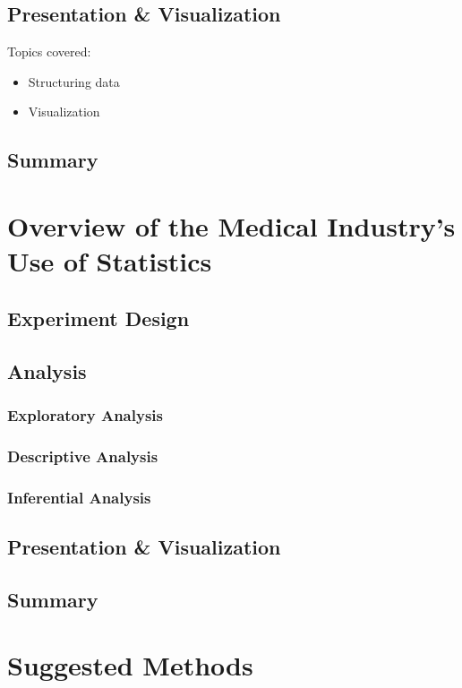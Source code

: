 \documentclass[11pt,a4paper,article]{memoir} %
\begin{document}
\section{Presentation \& Visualization}
Topics covered:
\begin{itemize}
\item Structuring data
\item Visualization
\end{itemize}

\section{Summary}

\newpage
\chapter{Overview of the Medical Industry's Use of Statistics}\label{industry_context} %

\section{Experiment Design}

\section{Analysis}
\subsection{Exploratory Analysis}
\subsection{Descriptive Analysis}
\subsection{Inferential Analysis}

\section{Presentation \& Visualization}

\section{Summary}

\newpage

\chapter{Suggested Methods}
\end{document}
